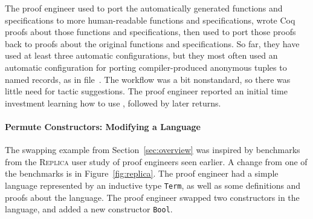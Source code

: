 The proof engineer used \toolnamec to port the automatically generated functions and specifications to more
human-readable functions and specifications, wrote Coq proofs about those functions and specifications, then
used \toolnamec to port those proofs back to
proofs about the original functions and specifications.
So far, they have used at least three automatic configurations,
but they most often used an automatic configuration for porting compiler-produced anonymous tuples
to named records, as in file~\href{https://github.com/Ptival/saw-core-coq/tree/dump-wip}{}. %
The workflow was a bit nonstandard,
so there was little need for tactic suggestions.
The proof engineer reported an initial time investment learning how to use \toolnamec,
followed by later returns.

\paragraph{Permute Constructors: Modifying a Language}
The swapping example from Section~\ref{sec:overview} was inspired by benchmarks 
from the \textsc{Replica} user study of proof engineers seen earlier. %
A change from one of the benchmarks is in Figure~\ref{fig:replica}.
The proof engineer had a simple language represented by an inductive type \lstinline{Term},
as well as some definitions and proofs about the language.
The proof engineer swapped two constructors in the language,
and added a new constructor \lstinline{Bool}.

